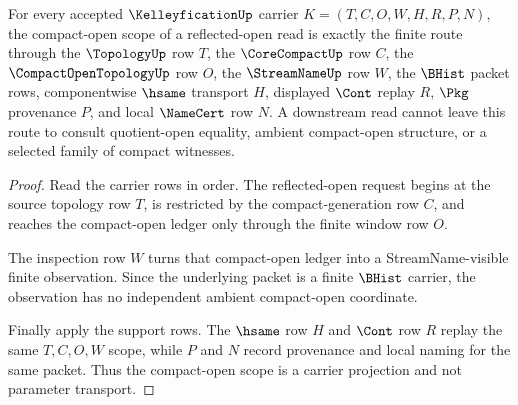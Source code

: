 \begin{theorem}
\label{thm:kelleyfication-compact-open-scope}
For every accepted $\KelleyficationUp$ carrier $K=(T,C,O,W,H,R,P,N)$, the compact-open scope of a reflected-open read is exactly the finite route through the $\TopologyUp$ row $T$, the $\CoreCompactUp$ row $C$, the $\CompactOpenTopologyUp$ row $O$, the $\StreamNameUp$ row $W$, the $\BHist$ packet rows, componentwise $\hsame$ transport $H$, displayed $\Cont$ replay $R$, $\Pkg$ provenance $P$, and local $\NameCert$ row $N$. A downstream read cannot leave this route to consult quotient-open equality, ambient compact-open structure, or a selected family of compact witnesses.
\end{theorem}
\begin{proof}
Read the carrier rows in order. The reflected-open request begins at the source topology row $T$, is restricted by the compact-generation row $C$, and reaches the compact-open ledger only through the finite window row $O$.

The inspection row $W$ turns that compact-open ledger into a StreamName-visible finite observation. Since the underlying packet is a finite $\BHist$ carrier, the observation has no independent ambient compact-open coordinate.

Finally apply the support rows. The $\hsame$ row $H$ and $\Cont$ row $R$ replay the same $T,C,O,W$ scope, while $P$ and $N$ record provenance and local naming for the same packet. Thus the compact-open scope is a carrier projection and not parameter transport.
\end{proof}

